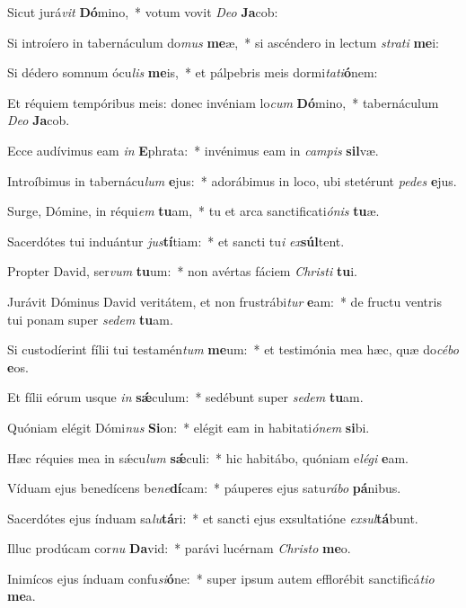 \item Sicut jurá\textit{vit} \textbf{Dó}mino,~* votum vovit \textit{De}\textit{o} \textbf{Ja}cob:
\item Si introíero in tabernáculum do\textit{mus} \textbf{me}æ,~* si ascéndero in lectum \textit{stra}\textit{ti} \textbf{me}i:
\item Si dédero somnum ócu\textit{lis} \textbf{me}is,~* et pálpebris meis dormi\textit{ta}\textit{ti}\textbf{ó}nem:
\item Et réquiem tempóribus meis: donec invéniam lo\textit{cum} \textbf{Dó}mino,~* tabernáculum \textit{De}\textit{o} \textbf{Ja}cob.
\item Ecce audívimus eam \textit{in} \textbf{E}phrata:~* invénimus eam in \textit{cam}\textit{pis} \textbf{sil}væ.
\item Introíbimus in tabernácu\textit{lum} \textbf{e}jus:~* adorábimus in loco, ubi stetérunt \textit{pe}\textit{des} \textbf{e}jus.
\item Surge, Dómine, in réqui\textit{em} \textbf{tu}am,~* tu et arca sanctificati\textit{ó}\textit{nis} \textbf{tu}æ.
\item Sacerdótes tui induántur \textit{jus}\textbf{tí}tiam:~* et sancti tu\textit{i} \textit{ex}\textbf{súl}tent.
\item Propter David, ser\textit{vum} \textbf{tu}um:~* non avértas fáciem \textit{Chris}\textit{ti} \textbf{tu}i.
\item Jurávit Dóminus David veritátem, et non frustrábi\textit{tur} \textbf{e}am:~* de fructu ventris tui ponam super \textit{se}\textit{dem} \textbf{tu}am.
\item Si custodíerint fílii tui testamén\textit{tum} \textbf{me}um:~* et testimónia mea hæc, quæ do\textit{cé}\textit{bo} \textbf{e}os.
\item Et fílii eórum usque \textit{in} \textbf{sǽ}culum:~* sedébunt super \textit{se}\textit{dem} \textbf{tu}am.
\item Quóniam elégit Dómi\textit{nus} \textbf{Si}on:~* elégit eam in habitati\textit{ó}\textit{nem} \textbf{si}bi.
\item Hæc réquies mea in sǽcu\textit{lum} \textbf{sǽ}culi:~* hic habitábo, quóniam e\textit{lé}\textit{gi} \textbf{e}am.
\item Víduam ejus benedícens be\textit{ne}\textbf{dí}cam:~* páuperes ejus satu\textit{rá}\textit{bo} \textbf{pá}nibus.
\item Sacerdótes ejus índuam sa\textit{lu}\textbf{tá}ri:~* et sancti ejus exsultatióne \textit{ex}\textit{sul}\textbf{tá}bunt.
\item Illuc prodúcam cor\textit{nu} \textbf{Da}vid:~* parávi lucérnam \textit{Chris}\textit{to} \textbf{me}o.
\item Inimícos ejus índuam confu\textit{si}\textbf{ó}ne:~* super ipsum autem efflorébit sanctificá\textit{ti}\textit{o} \textbf{me}a.
